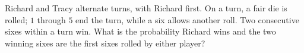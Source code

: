 Richard and Tracy alternate turns, with Richard first. On a turn, a fair die is rolled; $1$ through $5$ end the turn, while a six allows another roll. Two consecutive sixes within a turn win. What is the probability Richard wins and the two winning sixes are the first sixes rolled by either player?
